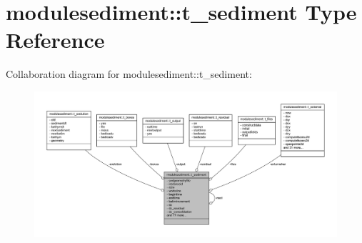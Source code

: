 \hypertarget{structmodulesediment_1_1t__sediment}{}\section{modulesediment\+:\+:t\+\_\+sediment Type Reference}
\label{structmodulesediment_1_1t__sediment}


Collaboration diagram for modulesediment\+:\+:t\+\_\+sediment\+:\nopagebreak
\begin{figure}[H]
\begin{center}
\leavevmode
\includegraphics[width=350pt]{structmodulesediment_1_1t__sediment__coll__graph}
\end{center}
\end{figure}
